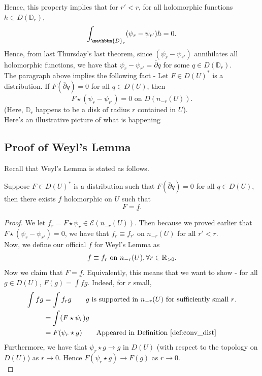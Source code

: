 \documentclass{article}
\begin{document}
{Hence, this property implies that for $r' < r$, for all holomorphic functions $h \in D(\mathbb{D}_r)$,
\[\int_{\mathbbm{D}_r} (\psi_r - \psi_{r'}) h = 0.\]
Hence, from last Thursday's last theorem, since $(\psi_r - \psi_{r'})$ annihilates all holomorphic functions, we have that $\psi_r - \psi_{r'} = \overline{\partial} q$ for some $q \in D(\mathbb{D}_r)$.\\

The paragraph above implies the following fact - Let $F \in D(U)^*$ is a distribution. If $F(\overline{\partial} q) = 0$ for all $q \in D(U)$, then
\[F \star (\psi_r - \psi_{r'}) = 0 \text{ on $D(n_{-r}(U))$}. \]
(Here, $\mathbb{D}_r$ happens to be a disk of radius $r$ contained in $U$).\\

Here's an illustrative picture of what is happening
\[\]

\subsection{Proof of Weyl's Lemma}

Recall that Weyl's Lemma is stated as follows.
\begin{theorem}
    Suppose $F \in D(U)^*$ is a distribution such that $F(\overline{\partial} q) = 0$ for all $q \in D(U)$, then there exists $f $ holomorphic on $U$ such that
   \[F = \underline{f}.\]
\end{theorem}

\begin{proof}
    We let $f_r = F \star \psi_r \in \mathcal{E}(n_{-r}(U))$. Then because we proved earlier that $F \star (\psi_r - \psi_{r'}) = 0$, we have that $f_r \equiv f_{r'}$ on $n_{-r}(U)$ for all $r' < r$.\\

    Now, we define our official $f$ for Weyl's Lemma as
    \[f \equiv f_r \text{ on } n_{-r}(U), \forall r \in \mathbb{R}_{> 0}.\]
    Now we claim that $F = \underline{f}$. Equivalently, this means that we want to show - for all $g \in D(U)$, $F(g) = \int fg$. Indeed, for $r$ small,
    \begin{align*}
        \int fg &= \int f_r g \tag*{$g$ is supported in $n_{-r}(U)$ for sufficiently small $r$.}\\
        &= \int (F \star \psi_r) g\\
        &= F(\psi_r \star g) \tag*{Appeared in Definition~\ref{def:conv_dist}}
    \end{align*}
    Furthermore, we have that $\psi_r \star g \to g$ in $D(U)$ (with respect to the topology on $D(U)$) as $r \to 0$. Hence $F(\psi_r \star g) \to F(g)$ as $r \to 0$.\\


\end{proof}}
\end{document}
